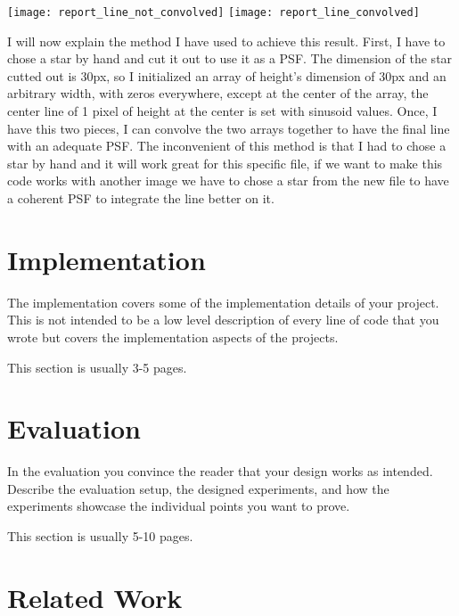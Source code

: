 \documentclass[a4paper,12pt,oneside]{report}
\begin{document}
\begin{center}
    \texttt{[image: report\_line\_not\_convolved]}
    \label{lineNotConvolved}
    \texttt{[image: report\_line\_convolved]}
    \label{lineConvolved}
\end{center}

I will now explain the method I have used to achieve this result. First, I have to chose a star by hand and cut it out to use it as a PSF.
The dimension of the star cutted out is 30px, so I initialized an array of height's dimension of 30px and an arbitrary width, with zeros everywhere,
except at the center of the array, the center line of 1 pixel of height at the center is set with sinusoid values. Once, I have this two pieces,
I can convolve the two arrays together to have the final line with an adequate PSF. 
\newline
The inconvenient of this method is that I had to chose a star by hand and it will work great for this specific file, if we want to make this code 
works with another image we have to chose a star from the new file to have a coherent PSF to integrate the line better on it.


\chapter{Implementation}

The implementation covers some of the implementation details of your project.
This is not intended to be a low level description of every line of code that
you wrote but covers the implementation aspects of the projects.

This section is usually 3-5 pages.


\chapter{Evaluation}

In the evaluation you convince the reader that your design works as intended.
Describe the evaluation setup, the designed experiments, and how the
experiments showcase the individual points you want to prove.

This section is usually 5-10 pages.


\chapter{Related Work}
\end{document}
